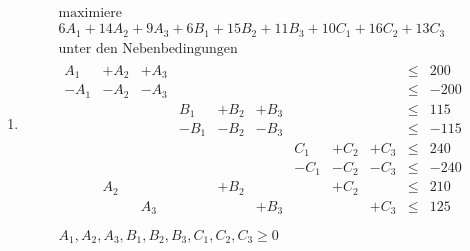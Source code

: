 \documentclass[a4paper]{scrartcl}
\begin{document}
\begin{enumerate}[label=\bfseries\arabic*.]
\begin{enumerate}
            \item
                \begin{equation}
                    \begin{gathered}
                        \text{maximiere} \\
                        6A_1 +14A_2 +9A_3 +6B_1 +15B_2 +11B_3 +10C_1 +16C_2 +13C_3 \\
                        \text{unter den Nebenbedingungen} \\
                        \begin{array}{rrrrrrrrrcr}
                            A_1 & +A_2 & +A_3 & & & & & & &  \leq & 200 \\
                            -A_1 & -A_2 & -A_3 & & & & & & & \leq & -200 \\
                            & & & B_1 & +B_2 & +B_3 & & & &  \leq & 115 \\
                            & & & -B_1 & -B_2 & -B_3 & & & & \leq & -115 \\
                            & & & & & & C_1 & +C_2 & +C_3 &  \leq & 240 \\
                            & & & & & & -C_1 & -C_2 & -C_3 & \leq & -240 \\
                            & A_2 & & & +B_2 & & & +C_2 & &  \leq & 210 \\
                            & & A_3 & & & +B_3 & & & +C_3 &  \leq & 125 \\
                        \end{array} \\
                        A_1, A_2, A_3, B_1, B_2, B_3, C_1, C_2, C_3 \geq 0
                    \end{gathered}
                \end{equation}
                

        \end{enumerate}

\end{enumerate}
\end{document}
